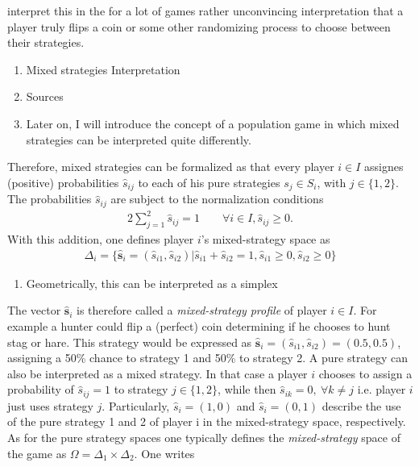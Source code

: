 \documentclass[12pt]{article}
\newcommand{\player}{I}
\newcommand{\strat}{S}
\newcommand{\stu}{s}
\newcommand{\sprob}{\hat{s}}
\newcommand{\svec}{\vec{\sprob}}
\renewcommand{\vec}{\mathbf}
\begin{document}
interpret this in the for a lot of games rather unconvincing interpretation
that a player truly flips a coin or some other randomizing process to choose
between their strategies. 
\begin{enumerate}
        \item Mixed strategies Interpretation
       \item Sources
        \item Later on, I will introduce the concept of a population game in
                which mixed strategies can be interpreted quite differently.
\end{enumerate} 
Therefore, mixed strategies can be formalized as that every player $i \in 
\player$ assignes (positive) probabilities $\sprob_{ij}$ to each of his pure
strategies $\stu_j \in \strat_i$, with $j \in \{1,2\}$. The probabilities 
$\sprob_{ij}$ are subject to the normalization conditions
\begin{alignat*}{2}
        \sum_{j=1}^{2} \sprob_{ij}= 1 \qquad \forall i \in I, \sprob_{ij} \geq 0.
\end{alignat*}
With this addition, one defines player $i$'s mixed-strategy space as 
\begin{align*}
        \Delta_i = \{\svec_i = \left(\sprob_{i1}, \sprob_{i2}\right)| \sprob_{i1} + 
        \sprob_{i2} = 1, \sprob_{i1} \geq 0, \sprob_{i2} \geq 0\}
\end{align*}
\begin{enumerate}
        \item   Geometrically, this can be interpreted as a simplex
\end{enumerate}
The vector $\svec_i$ is therefore called a \textit{mixed-strategy profile} of player
$i \in I$. For example a hunter could flip a (perfect) coin determining if 
he chooses to hunt stag or hare. This strategy would be expressed as
$\svec_i = \left( \sprob_{i1},\sprob_{i2}\right)= \left(0.5,0.5\right)$, 
assigning a 50\% chance to strategy 1 and 50\% to strategy 2. 
A pure strategy can also be interpreted as a mixed strategy. In that case a 
player $i$ chooses to assign a probability of $\sprob_{ij}=1$ to strategy
$j \in \{1,2\}$, while then $\sprob_{ik}=0, \ \forall k \neq j$ i.e. player $i$ 
just uses strategy $j$. Particularly, $\sprob_i = \left(1,0\right)$ and 
$\sprob_i = \left(0,1\right)$ describe the use of the pure strategy 1 and 2 of 
player i in the mixed-strategy space, respectively. 
As for the pure strategy spaces one typically defines the \textit{mixed-strategy}
space of the game as $\Omega = \Delta_1 \times \Delta_2$. One writes 
\end{document}
